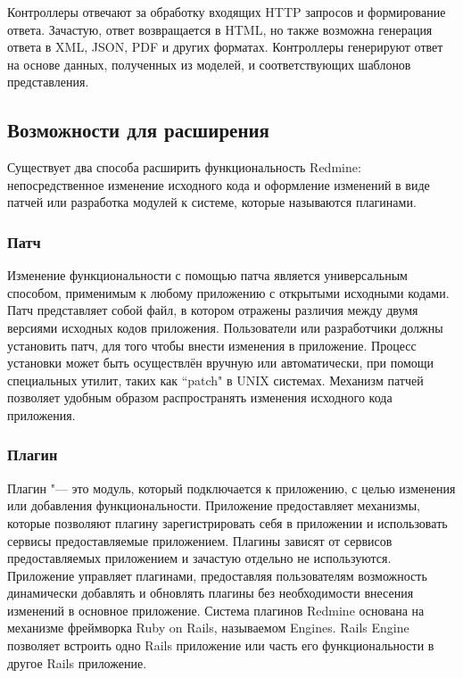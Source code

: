 Контроллеры отвечают за обработку входящих HTTP запросов и формирование ответа.
Зачастую, ответ возвращается в HTML, но также возможна генерация ответа в XML,
JSON, PDF и других форматах. Контроллеры генерируют ответ на основе данных,
полученных из моделей, и соответствующих шаблонов представления.

\subsection{Возможности для расширения}
Существует два способа расширить функциональность Redmine: непосредственное
изменение исходного кода и оформление изменений в виде патчей или разработка 
модулей к системе, которые называются плагинами.

\subsubsection{Патч}
Изменение функциональности с помощью патча является универсальным способом,
применимым к любому приложению с открытыми исходными кодами. Патч представляет
собой файл, в котором отражены различия между двумя версиями исходных кодов
приложения. Пользователи или разработчики должны установить патч, для того
чтобы внести изменения в приложение. Процесс установки может быть осуществлён
вручную или автоматически, при помощи специальных утилит, таких как ``patch" в
UNIX системах. Механизм патчей позволяет удобным образом распространять
изменения исходного кода приложения.

\subsubsection{Плагин}
Плагин "--- это модуль, который подключается к приложению, с целью изменения
или добавления функциональности. Приложение предоставляет механизмы, которые
позволяют плагину зарегистрировать себя в приложении и использовать сервисы
предоставляемые приложением. Плагины зависят от сервисов предоставляемых
приложением и зачастую отдельно не используются. Приложение управляет
плагинами, предоставляя пользователям возможность динамически добавлять и
обновлять плагины без необходимости внесения изменений в основное приложение.
Система плагинов Redmine основана на механизме фреймворка Ruby on Rails,
называемом Engines. Rails Engine позволяет встроить одно Rails приложение или
часть его функциональности в другое Rails приложение.

